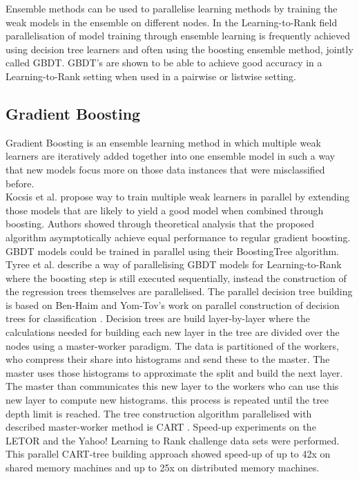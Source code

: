 Ensemble methods can be used to parallelise learning methods by training the weak models in the ensemble on different nodes. In the Learning-to-Rank field parallelisation of model training through ensemble learning is frequently achieved using decision tree learners and often using the boosting ensemble method, jointly called \acf{GBDT}. \ac{GBDT}'s are shown to be able to achieve good accuracy in a Learning-to-Rank setting when used in a pairwise \cite{Zheng2007} or listwise \cite{Chen2008} setting.

\subsection{Gradient Boosting}
Gradient Boosting \cite{Friedman2001} is an ensemble learning method in which multiple weak learners are iteratively added together into one ensemble model in such a way that new models focus more on those data instances that were misclassified before.\\

Kocsis et al. \cite{Kocsis2013} propose way to train multiple weak learners in parallel by extending those models that are likely to yield a good model when combined through boosting. Authors showed through theoretical analysis that the proposed algorithm asymptotically achieve equal performance to regular gradient boosting. \ac{GBDT} models could be trained in parallel using their BoostingTree algorithm.\\

Tyree et al. \cite{Tyree2011} describe a way of parallelising \ac{GBDT} models for Learning-to-Rank where the boosting step is still executed sequentially, instead the construction of the regression trees themselves are parallelised. The parallel decision tree building is based on Ben-Haim and Yom-Tov's work on parallel construction of decision trees for classification \cite{Ben-Haim2010}. Decision trees are build layer-by-layer where the calculations needed for building each new layer in the tree are divided over the nodes using a master-worker paradigm. The data is partitioned of the workers, who compress their share into histograms and send these to the master. The master uses those histograms to approximate the split and build the next layer. The master than communicates this new layer to the workers who can use this new layer to compute new histograms. this process is repeated until the tree depth limit is reached. The tree construction algorithm parallelised with described master-worker method is \ac{CART} \cite{Breiman1984}. Speed-up experiments on the LETOR and the Yahoo! Learning to Rank challenge data sets were performed. This parallel \ac{CART}-tree building approach showed speed-up of up to 42x on shared memory machines and up to 25x on distributed memory machines.\\

